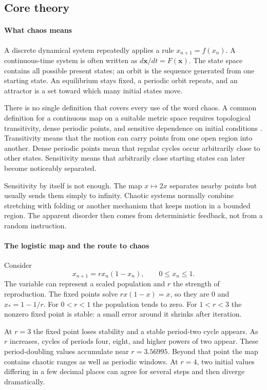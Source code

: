 \subsection*{Core theory}
\paragraph{What chaos means}
A discrete dynamical system repeatedly applies a rule
$x_{n+1}=f(x_n)$. A continuous-time system is often written as
$d\mathbf{x}/dt=F(\mathbf{x})$. The state space contains all possible
present states; an orbit is the sequence generated from one starting state.
An equilibrium stays fixed, a periodic orbit repeats, and an attractor is a
set toward which many initial states move.

There is no single definition that covers every use of the word chaos. A
common definition for a continuous map on a suitable metric space requires
topological transitivity, dense periodic points, and sensitive dependence on
initial conditions \cite{chaos_theory_ref2}. Transitivity means that the
motion can carry points from one open region into another. Dense periodic
points mean that regular cycles occur arbitrarily close to other states.
Sensitivity means that arbitrarily close starting states can later become
noticeably separated.

Sensitivity by itself is not enough. The map $x\mapsto2x$ separates nearby
points but usually sends them simply to infinity. Chaotic systems normally
combine stretching with folding or another mechanism that keeps motion in a
bounded region. The apparent disorder then comes from deterministic feedback,
not from a random instruction.

\paragraph{The logistic map and the route to chaos}
Consider
\[
x_{n+1}=r x_n(1-x_n),\qquad 0\leq x_n\leq1.
\]
The variable can represent a scaled population and $r$ the strength of
reproduction. The fixed points solve $rx(1-x)=x$, so they are $0$ and
$x_*=1-1/r$. For $0<r<1$ the population tends to zero. For $1<r<3$ the
nonzero fixed point is stable: a small error around it shrinks after
iteration.

At $r=3$ the fixed point loses stability and a stable period-two cycle
appears. As $r$ increases, cycles of periods four, eight, and higher powers
of two appear. These period-doubling values accumulate near
$r=3.56995$. Beyond that point the map contains chaotic ranges as well as
periodic windows. At $r=4$, two initial values differing in a few decimal
places can agree for several steps and then diverge dramatically.

